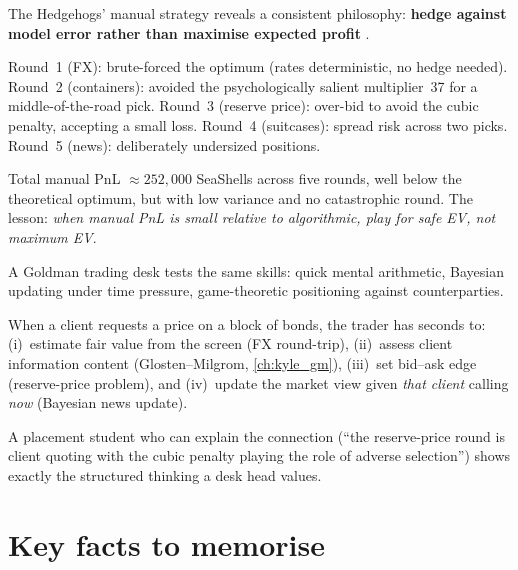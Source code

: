 \begin{prosperitybox}
The Hedgehogs' manual strategy reveals a consistent philosophy:
\textbf{hedge against model error rather than maximise expected
profit} \citep{frankfurtHedgehogs2025imcP3}.

Round~1 (FX): brute-forced the optimum (rates deterministic, no
hedge needed).  Round~2 (containers): avoided the psychologically
salient multiplier~37 for a middle-of-the-road pick.  Round~3
(reserve price): over-bid to avoid the cubic penalty, accepting
a small loss.  Round~4 (suitcases): spread risk across two picks.
Round~5 (news): deliberately undersized positions.

Total manual PnL $\approx 252{,}000$ SeaShells across five rounds,
well below the theoretical optimum, but with low variance and no
catastrophic round.  The lesson: \emph{when manual PnL is small
relative to algorithmic, play for safe EV, not maximum EV}.
\end{prosperitybox}


\begin{gsbox}
A Goldman trading desk tests the same skills: quick mental
arithmetic, Bayesian updating under time pressure, game-theoretic
positioning against counterparties.

When a client requests a price on a block of bonds, the trader
has seconds to: (i)~estimate fair value from the screen
(FX round-trip), (ii)~assess client information content
(Glosten--Milgrom, \cref{ch:kyle_gm}), (iii)~set bid--ask edge
(reserve-price problem), and (iv)~update the market view given
\emph{that client} calling \emph{now} (Bayesian news update).

A placement student who can explain the connection (``the
reserve-price round is client quoting with the cubic penalty
playing the role of adverse selection'') shows exactly the
structured thinking a desk head values.
\end{gsbox}


\section{Key facts to memorise}
\label{sec:ch25_key_facts}


